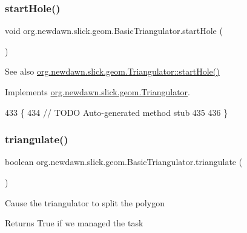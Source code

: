 \subsubsection{\texorpdfstring{start\+Hole()}{startHole()}}
{\footnotesize\ttfamily void org.\+newdawn.\+slick.\+geom.\+Basic\+Triangulator.\+start\+Hole (\begin{DoxyParamCaption}{ }\end{DoxyParamCaption})\hspace{0.3cm}{\ttfamily [inline]}}

\begin{DoxySeeAlso}{See also}
\mbox{\hyperlink{interfaceorg_1_1newdawn_1_1slick_1_1geom_1_1_triangulator_a0636d620daef98eab2ceb5bcf9dfaa9d}{org.\+newdawn.\+slick.\+geom.\+Triangulator\+::start\+Hole()}} 
\end{DoxySeeAlso}


Implements \mbox{\hyperlink{interfaceorg_1_1newdawn_1_1slick_1_1geom_1_1_triangulator_a0636d620daef98eab2ceb5bcf9dfaa9d}{org.\+newdawn.\+slick.\+geom.\+Triangulator}}.


\begin{DoxyCode}
433                             \{
434         \textcolor{comment}{// TODO Auto-generated method stub}
435         
436     \}
\end{DoxyCode}
\mbox{\label{classorg_1_1newdawn_1_1slick_1_1geom_1_1_basic_triangulator_ab83576d3940583b73bf3224acacf4e48}} 
\subsubsection{\texorpdfstring{triangulate()}{triangulate()}}
{\footnotesize\ttfamily boolean org.\+newdawn.\+slick.\+geom.\+Basic\+Triangulator.\+triangulate (\begin{DoxyParamCaption}{ }\end{DoxyParamCaption})\hspace{0.3cm}{\ttfamily [inline]}}

Cause the triangulator to split the polygon

\begin{DoxyReturn}{Returns}
True if we managed the task 
\end{DoxyReturn}


